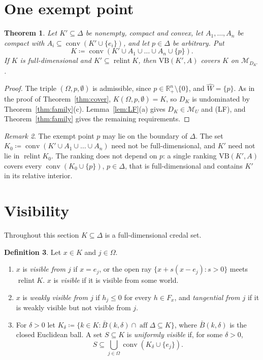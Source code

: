 \documentclass[11pt]{article}
\newcommand{\R}{\mathbb{R}}
\newcommand{\M}{\mathcal{M}}
\newcommand{\VB}{\mathrm{VB}}
\DeclareMathOperator{\conv}{conv}
\DeclareMathOperator{\relint}{relint}
\DeclareMathOperator{\aff}{aff}
\theoremstyle{plain}
\newtheorem{theorem}{Theorem}[section]
\theoremstyle{definition}
\newtheorem{definition}[theorem]{Definition}
\theoremstyle{remark}
\newtheorem{remark}[theorem]{Remark}
\begin{document}
\section{One exempt point}\label{sec:exempt}

\begin{theorem}\label{thm:exempt}
Let $K'\subseteq\Delta$ be nonempty, compact and convex, let $A_1,\dots,A_n$ be compact
with $A_i\subseteq\conv(K'\cup\{e_i\})$, and let $p\in\Delta$ be arbitrary. Put
\[
  K\coloneqq\conv(K'\cup A_1\cup\dots\cup A_n\cup\{p\}).
\]
If $K$ is full-dimensional and $K'\subseteq\relint K$, then $\VB(K',A)$ covers $K$ on
$\M_{D_{K'}}$.
\end{theorem}

\begin{proof}
The triple $(\Omega,p,\emptyset)$ is admissible, since $p\in\R^n_+\setminus\{0\}$, and
$\hat W=\{p\}$. As in the proof of Theorem~\ref{thm:cover}, $K(\Omega,p,\emptyset)=K$, so
$D_K$ is undominated by Theorem~\ref{thm:family}(c). Lemma~\ref{lem:LF}(a) gives $D_K\in
\M_U$ and (LF), and Theorem~\ref{thm:family} gives the remaining requirements.
\end{proof}

\begin{remark}\label{rem:exempt}
The exempt point $p$ may lie on the boundary of $\Delta$. The set
$K_0\coloneqq\conv(K'\cup A_1\cup\dots\cup A_n)$ need not be full-dimensional, and $K'$
need not lie in $\relint K_0$. The ranking does not depend on $p$: a single ranking
$\VB(K',A)$ covers every $\conv(K_0\cup\{p\})$, $p\in\Delta$, that is full-dimensional and
contains $K'$ in its relative interior.
\end{remark}

\section{Visibility}\label{sec:vis}

Throughout this section $K\subseteq\Delta$ is a full-dimensional credal set.

\begin{definition}\label{def:vis}
Let $x\in K$ and $j\in\Omega$.
\begin{enumerate}[label=(\alph*)]
  \item $x$ is \emph{visible from $j$} if $x=e_j$, or the open ray $\{x+s(x-e_j):s>0\}$
  meets $\relint K$. $x$ is \emph{visible} if it is visible from some world.
  \item $x$ is \emph{weakly visible from $j$} if $h_j\le0$ for every $h\in F_x$, and
  \emph{tangential from $j$} if it is weakly visible but not visible from $j$.
  \item For $\delta>0$ let $K_\delta\coloneqq\{k\in K:\bar B(k,\delta)\cap\aff\Delta
  \subseteq K\}$, where $\bar B(k,\delta)$ is the closed Euclidean ball. A set $S\subseteq
  K$ is \emph{uniformly visible} if, for some $\delta>0$,
  \[
    S\subseteq\bigcup_{j\in\Omega}\conv(K_\delta\cup\{e_j\}).
  \]
\end{enumerate}
\end{definition}
\end{document}
